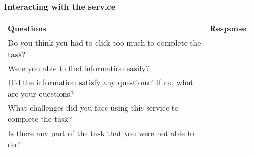 \subsubsection{Interacting with the service}

\begin{table}[h]
\centering
\renewcommand{\arraystretch}{1.5}
\begin{tabularx}{\textwidth}{|X|X|}
\hline
\textbf{Questions} & \textbf{Response} \\ \hline
Do you think you had to click too much to complete the task? &  \\ \hline
Were you able to find information easily? &  \\ \hline
Did the information satisfy any questions? If no, what are your questions? &  \\ \hline
What challenges did you face using this service to complete the task? &  \\ \hline
Is there any part of the task that you were not able to do? &  \\ \hline
\end{tabularx}
\end{table}